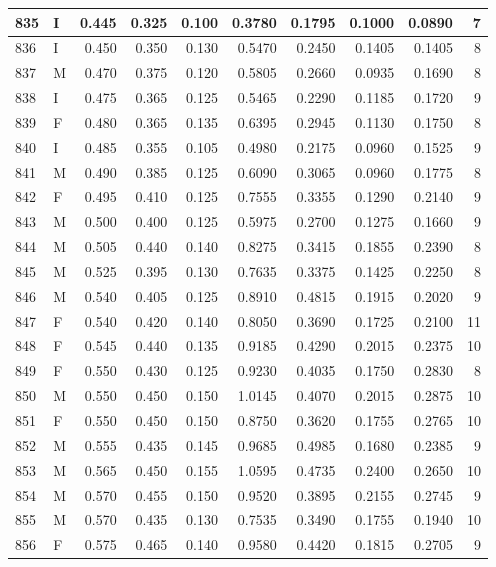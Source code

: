 \documentclass[9pt,twocolumn,twoside,]{pnas-new}
\begin{document}
\begin{tabular}{l|l|r|r|r|r|r|r|r|r}
\hline
835 & I & 0.445 & 0.325 & 0.100 & 0.3780 & 0.1795 & 0.1000 & 0.0890 & 7\\
\hline
836 & I & 0.450 & 0.350 & 0.130 & 0.5470 & 0.2450 & 0.1405 & 0.1405 & 8\\
\hline
837 & M & 0.470 & 0.375 & 0.120 & 0.5805 & 0.2660 & 0.0935 & 0.1690 & 8\\
\hline
838 & I & 0.475 & 0.365 & 0.125 & 0.5465 & 0.2290 & 0.1185 & 0.1720 & 9\\
\hline
839 & F & 0.480 & 0.365 & 0.135 & 0.6395 & 0.2945 & 0.1130 & 0.1750 & 8\\
\hline
840 & I & 0.485 & 0.355 & 0.105 & 0.4980 & 0.2175 & 0.0960 & 0.1525 & 9\\
\hline
841 & M & 0.490 & 0.385 & 0.125 & 0.6090 & 0.3065 & 0.0960 & 0.1775 & 8\\
\hline
842 & F & 0.495 & 0.410 & 0.125 & 0.7555 & 0.3355 & 0.1290 & 0.2140 & 9\\
\hline
843 & M & 0.500 & 0.400 & 0.125 & 0.5975 & 0.2700 & 0.1275 & 0.1660 & 9\\
\hline
844 & M & 0.505 & 0.440 & 0.140 & 0.8275 & 0.3415 & 0.1855 & 0.2390 & 8\\
\hline
845 & M & 0.525 & 0.395 & 0.130 & 0.7635 & 0.3375 & 0.1425 & 0.2250 & 8\\
\hline
846 & M & 0.540 & 0.405 & 0.125 & 0.8910 & 0.4815 & 0.1915 & 0.2020 & 9\\
\hline
847 & F & 0.540 & 0.420 & 0.140 & 0.8050 & 0.3690 & 0.1725 & 0.2100 & 11\\
\hline
848 & F & 0.545 & 0.440 & 0.135 & 0.9185 & 0.4290 & 0.2015 & 0.2375 & 10\\
\hline
849 & F & 0.550 & 0.430 & 0.125 & 0.9230 & 0.4035 & 0.1750 & 0.2830 & 8\\
\hline
850 & M & 0.550 & 0.450 & 0.150 & 1.0145 & 0.4070 & 0.2015 & 0.2875 & 10\\
\hline
851 & F & 0.550 & 0.450 & 0.150 & 0.8750 & 0.3620 & 0.1755 & 0.2765 & 10\\
\hline
852 & M & 0.555 & 0.435 & 0.145 & 0.9685 & 0.4985 & 0.1680 & 0.2385 & 9\\
\hline
853 & M & 0.565 & 0.450 & 0.155 & 1.0595 & 0.4735 & 0.2400 & 0.2650 & 10\\
\hline
854 & M & 0.570 & 0.455 & 0.150 & 0.9520 & 0.3895 & 0.2155 & 0.2745 & 9\\
\hline
855 & M & 0.570 & 0.435 & 0.130 & 0.7535 & 0.3490 & 0.1755 & 0.1940 & 10\\
\hline
856 & F & 0.575 & 0.465 & 0.140 & 0.9580 & 0.4420 & 0.1815 & 0.2705 & 9\\

\end{tabular}
\end{document}

